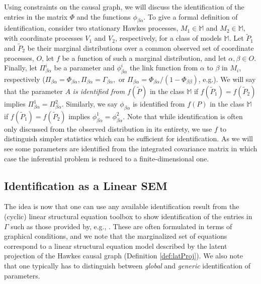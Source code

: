 \documentclass[accepted]{uai2021} %
\begin{document}
Using constraints on the causal graph, we will discuss the identification of 
the entries in the 
matrix $\Phi$ and the functions $\phi_{\beta\alpha}$. To give a formal 
definition 
of 
identification, consider two stationary Hawkes 
processes, $M_1\in\mathbb{M}$ and $M_2\in\mathbb{M}$, with coordinate processes 
$V_1$ and $V_2$, 
respectively, for a class of models $\mathbb{M}$. Let $ \tilde{P}_1$ and $ 
\tilde{P}_2$ be their marginal 
distributions over a common observed set of 
coordinate processes, $O$, let $f$ be a function of 
such a marginal distribution, and let 
$\alpha,\beta\in O$. Finally, let $\Pi_{\beta\alpha}^i$ be a parameter and 
$\phi_{\beta\alpha}^i$ the link function from $\alpha$ to 
$\beta$ in $M_i$, respectively ($\Pi_{\beta\alpha} = \Phi_{\beta\alpha}, 
\Pi_{\beta\alpha}=\Gamma_{\beta\alpha},$ or $\Pi_{\beta\alpha} = 
\Phi_{\beta\alpha}/(1-\Phi_{\beta\beta})$, e.g.). We will say that the 
parameter 
$A$ \emph{is 
identified from} 
$f(\tilde{P})$ in the class $\mathbb{M}$ if $f(\tilde{P}_1) = f(\tilde{P}_2)$ 
implies $\Pi_{\beta\alpha}^1 = 
\Pi_{\beta\alpha}^2$. Similarly, we say 
$\phi_{\beta\alpha}$ is identified from $f(P)$ in the class $\mathbb{M}$ if 
$f(\tilde{P}_1) = 
f(\tilde{P}_2)$ 
implies $\phi_{\beta\alpha}^1 = \phi_{\beta\alpha}^2$. Note that while 
identification 
is often only discussed from the 
observed distribution in its entirety, we use $f$ to distinguish simpler 
statistics which can be sufficient for identification. As we will see some 
parameters are identified from the integrated covariance matrix in which case 
the inferential problem is reduced to a finite-dimensional one.



\subsection{Identification as a Linear SEM}

The idea is now 
that one can use any available identification result from the (cyclic) linear 
structural equation toolbox to show identification of the entries in 
$\Gamma$ such as those provided by, e.g., \cite{foygelHalftrek2012, 
	chenNIPS2016, 
	weihs2018}. 
These are often 
formulated in terms of graphical 
conditions, and we note that the 
marginalized set of equations correspond to a linear structural 
equation model described by the latent projection of the Hawkes causal graph 
(Definition \ref{def:latProj}). We also note that one typically has to 
distinguish between \emph{global} and \emph{generic} identification of 
parameters.
\end{document}
